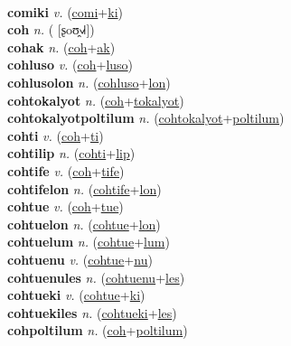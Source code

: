  \label{comilyan} \\
\textbf{comiki} \textit{v.} (\hyperref[comi]{comi}+\hyperref[ki]{ki})
 \label{comiki} \\
\textbf{coh} \textit{n.} ( [ʂoʊ̯˧˩˧])
 \label{coh} \\
\textbf{cohak} \textit{n.} (\hyperref[coh]{coh}+\hyperref[ak]{ak})
 \label{cohak} \\
\textbf{cohluso} \textit{v.} (\hyperref[coh]{coh}+\hyperref[luso]{luso})
 \label{cohluso} \\
\textbf{cohlusolon} \textit{n.} (\hyperref[cohluso]{cohluso}+\hyperref[lon]{lon})
 \label{cohlusolon} \\
\textbf{cohtokalyot} \textit{n.} (\hyperref[coh]{coh}+\hyperref[tokalyot]{tokalyot})
 \label{cohtokalyot} \\
\textbf{cohtokalyotpoltilum} \textit{n.} (\hyperref[cohtokalyot]{cohtokalyot}+\hyperref[poltilum]{poltilum})
 \label{cohtokalyotpoltilum} \\
\textbf{cohti} \textit{v.} (\hyperref[coh]{coh}+\hyperref[ti]{ti})
 \label{cohti} \\
\textbf{cohtilip} \textit{n.} (\hyperref[cohti]{cohti}+\hyperref[lip]{lip})
 \label{cohtilip} \\
\textbf{cohtife} \textit{v.} (\hyperref[coh]{coh}+\hyperref[tife]{tife})
 \label{cohtife} \\
\textbf{cohtifelon} \textit{n.} (\hyperref[cohtife]{cohtife}+\hyperref[lon]{lon})
 \label{cohtifelon} \\
\textbf{cohtue} \textit{v.} (\hyperref[coh]{coh}+\hyperref[tue]{tue})
 \label{cohtue} \\
\textbf{cohtuelon} \textit{n.} (\hyperref[cohtue]{cohtue}+\hyperref[lon]{lon})
 \label{cohtuelon} \\
\textbf{cohtuelum} \textit{n.} (\hyperref[cohtue]{cohtue}+\hyperref[lum]{lum})
 \label{cohtuelum} \\
\textbf{cohtuenu} \textit{v.} (\hyperref[cohtue]{cohtue}+\hyperref[nu]{nu})
 \label{cohtuenu} \\
\textbf{cohtuenules} \textit{n.} (\hyperref[cohtuenu]{cohtuenu}+\hyperref[les]{les})
 \label{cohtuenules} \\
\textbf{cohtueki} \textit{v.} (\hyperref[cohtue]{cohtue}+\hyperref[ki]{ki})
 \label{cohtueki} \\
\textbf{cohtuekiles} \textit{n.} (\hyperref[cohtueki]{cohtueki}+\hyperref[les]{les})
 \label{cohtuekiles} \\
\textbf{cohpoltilum} \textit{n.} (\hyperref[coh]{coh}+\hyperref[poltilum]{poltilum})
